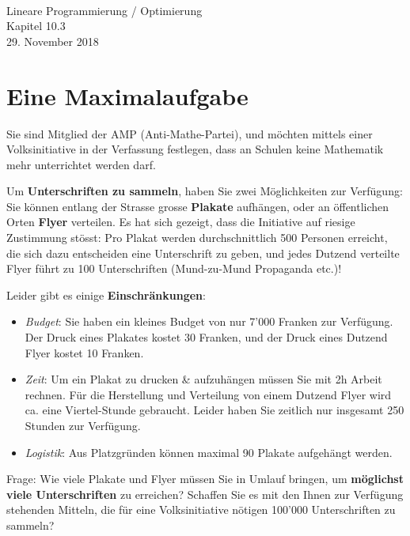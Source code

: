 \documentclass[a4paper,11pt]{exam}
\newcommand*{\lightgraygrid}{
	\definecolor{GridColor}{rgb}{0.85, 0.85, 0.85}
	\setlength{\gridsize}{4mm}
}
\newcommand*{\graygrid}{
	\definecolor{GridColor}{rgb}{0.7, 0.7, 0.7}
	\setlength{\gridsize}{4mm}
}
\begin{document}

\ifprintanswers \lightgraygrid{} \else \graygrid{} \fi

\begin{center}
	\\[2cm] \else
	\vspace*{1.7cm} \fi
	\LARGE{Lineare Programmierung / Optimierung}\\
	\vspace{1cm}
	\large{Kapitel 10.3}\\
	\vspace{.5cm}
	\large{29. November 2018}\\
\end{center}

\vfil

\section*{Eine Maximalaufgabe}

\begin{mdframed}
Sie sind Mitglied der AMP (Anti-Mathe-Partei), und möchten mittels einer Volksinitiative in der Verfassung festlegen, dass an Schulen keine Mathematik mehr unterrichtet werden darf.

Um \textbf{Unterschriften zu sammeln}, haben Sie zwei Möglichkeiten zur Verfügung: Sie können entlang der Strasse grosse \textbf{Plakate} aufhängen, oder an öffentlichen Orten \textbf{Flyer} verteilen. Es hat sich gezeigt, dass die Initiative auf riesige Zustimmung stösst: Pro Plakat werden durchschnittlich 500 Personen erreicht, die sich dazu entscheiden eine Unterschrift zu geben, und jedes Dutzend verteilte Flyer führt zu 100 Unterschriften (Mund-zu-Mund Propaganda etc.)!

Leider gibt es einige \textbf{Einschränkungen}:
\begin{itemize}
\item \textit{Budget}: Sie haben ein kleines Budget von nur 7'000 Franken zur Verfügung. Der Druck eines Plakates kostet 30 Franken, und der Druck eines Dutzend Flyer kostet 10 Franken.
\item \textit{Zeit}: Um ein Plakat zu drucken \& aufzuhängen müssen Sie mit 2h Arbeit rechnen. Für die Herstellung und Verteilung von einem Dutzend Flyer wird ca. eine Viertel-Stunde gebraucht. Leider haben Sie zeitlich nur insgesamt 250 Stunden zur Verfügung.
\item \textit{Logistik}: Aus Platzgründen können maximal 90 Plakate aufgehängt werden.
\end{itemize}

{Frage}: Wie viele Plakate und Flyer müssen Sie in Umlauf bringen, um \textbf{möglichst viele Unterschriften} zu erreichen? Schaffen Sie es mit den Ihnen zur Verfügung stehenden Mitteln, die für eine Volksinitiative nötigen 100'000 Unterschriften zu sammeln?
\end{mdframed}
\end{document}
